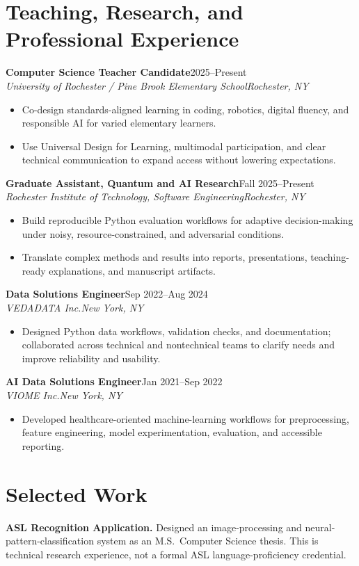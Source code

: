\documentclass[10pt,letterpaper]{article}
\newcommand{\role}[4]{%
  \textbf{#1}\hfill #2\\
  \textit{#3}\hfill \textit{#4}\vspace{-3pt}
}
\begin{document}
\section*{Teaching, Research, and Professional Experience}
\role{Computer Science Teacher Candidate}{2025--Present}
{University of Rochester / Pine Brook Elementary School}{Rochester, NY}
\begin{itemize}
  \item Co-design standards-aligned learning in coding, robotics, digital
    fluency, and responsible AI for varied elementary learners.
  \item Use Universal Design for Learning, multimodal participation, and clear
    technical communication to expand access without lowering expectations.
\end{itemize}

\role{Graduate Assistant, Quantum and AI Research}{Fall 2025--Present}
{Rochester Institute of Technology, Software Engineering}{Rochester, NY}
\begin{itemize}
  \item Build reproducible Python evaluation workflows for adaptive
    decision-making under noisy, resource-constrained, and adversarial
    conditions.
  \item Translate complex methods and results into reports, presentations,
    teaching-ready explanations, and manuscript artifacts.
\end{itemize}

\role{Data Solutions Engineer}{Sep 2022--Aug 2024}
{VEDADATA Inc.}{New York, NY}
\begin{itemize}
  \item Designed Python data workflows, validation checks, and documentation;
    collaborated across technical and nontechnical teams to clarify needs and
    improve reliability and usability.
\end{itemize}

\role{AI Data Solutions Engineer}{Jan 2021--Sep 2022}
{VIOME Inc.}{New York, NY}
\begin{itemize}
  \item Developed healthcare-oriented machine-learning workflows for
    preprocessing, feature engineering, model experimentation, evaluation, and
    accessible reporting.
\end{itemize}

\section*{Selected Work}
\textbf{ASL Recognition Application.}
Designed an image-processing and neural-pattern-classification system as an
M.S.\ Computer Science thesis. This is technical research experience, not a
formal ASL language-proficiency credential.
\end{document}
